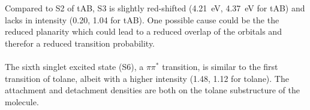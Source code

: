 Compared to S2 of tAB, S3 is slightly red-shifted (\SI[]{4.21}{\electronvolt}, \SI[]{4.37}{\electronvolt} for tAB) and lacks in intensity (0.20, 1.04 for tAB). 
One possible cause could be the the reduced planarity which could lead to a reduced overlap of the orbitals and therefor a reduced transition probability.\\
\\
The sixth singlet excited state (S6), a $\pi\pi^*$ transition, is similar to the first transition of tolane, albeit with a higher intensity (1.48, 1.12 for tolane).
The attachment and detachment densities are both on the tolane substructure of the molecule. 
%
%
%
%
%
%
%

